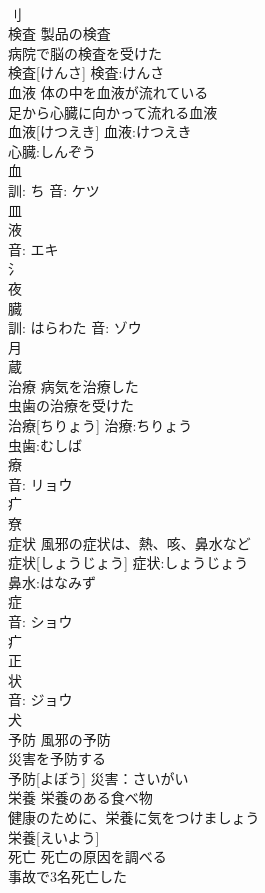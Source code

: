 \documentclass[8pt]{extreport}
\begin{document}
\begin{CJK}{UTF8}{min}
\\	刂 
\\	検査	製品の検査 
\\	病院で脳の検査を受けた 
\\	検査[けんさ]			検査:けんさ
\\	血液	体の中を血液が流れている 
\\	足から心臓に向かって流れる血液 
\\	血液[けつえき]			血液:けつえき
\\	心臓:しんぞう
\\	血 
\\	訓: ち 音: ケツ 
\\	皿 
\\	液 
\\	音: エキ 
\\	氵 
\\	夜 
\\	臓 
\\	訓: はらわた 音: ゾウ 
\\	月 
\\	蔵 
\\	治療	病気を治療した 
\\	虫歯の治療を受けた 
\\	治療[ちりょう]			治療:ちりょう
\\	虫歯:むしば
\\	療 
\\	音: リョウ 
\\	疒 
\\	尞	
\\	症状	風邪の症状は、熱、咳、鼻水など 
\\	症状[しょうじょう]			症状:しょうじょう
\\	鼻水:はなみず
\\	症 
\\	音: ショウ 
\\	疒 
\\	正 
\\	状 
\\	音: ジョウ 
\\	犬 
\\	予防	風邪の予防 
\\	災害を予防する 
\\	予防[よぼう]			災害：さいがい
\\	栄養	栄養のある食べ物 
\\	健康のために、栄養に気をつけましょう 
\\	栄養[えいよう]						
\\	死亡	死亡の原因を調べる 
\\	事故で3名死亡した 

\end{CJK}
\end{document}
